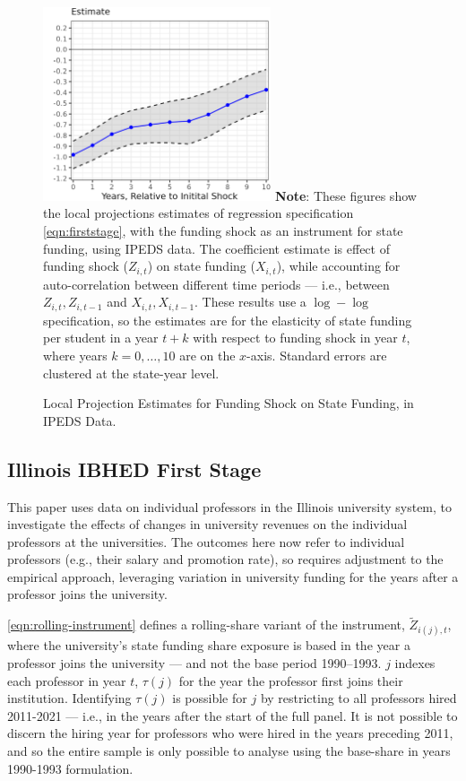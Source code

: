 \begin{figure}[H]
    \centering
    \singlespacing
    \caption{Local Projection Estimates for Funding Shock on State Funding, in IPEDS Data.}
    \includegraphics[width=0.6\textwidth]{figures/firststage-lp.png}
    \label{fig:firststage-lp}
    \justify
    \footnotesize
    \textbf{Note}:
    These figures show the local projections estimates of regression specification \eqref{eqn:firststage}, with the funding shock as an instrument for state funding, using IPEDS data.
    The coefficient estimate is effect of funding shock ($Z_{i,t}$) on state funding ($X_{i,t}$), while accounting for auto-correlation between different time periods --- i.e., between $Z_{i,t}, Z_{i,t-1}$ and $X_{i,t}, X_{i,t-1}$.
    These results use a $\log-\log$ specification, so the estimates are for the elasticity of state funding per student in a year $t+k$ with respect to funding shock in year $t$, where years $k = 0, \hdots, 10$ are on the $x$-axis. 
    Standard errors are clustered at the state-year level.
\end{figure}

\newpage
\subsection{Illinois IBHED First Stage}
\label{sec:iv-model-indiv}

This paper uses data on individual professors in the Illinois university system, to investigate the effects of changes in university revenues on the individual professors at the universities.
The outcomes here now refer to individual professors (e.g., their salary and promotion rate), so requires adjustment to the empirical approach, leveraging variation in university funding for the years after a professor joins the university.

\autoref{eqn:rolling-instrument} defines a rolling-share variant of the instrument, $\tilde Z_{i(j),t}$, where the university's state funding share exposure is based in the year a professor joins the university --- and not the base period 1990--1993.
$j$ indexes each professor in year $t$, $\tau(j)$ for the year the professor first joins their institution.
Identifying $\tau(j)$ is possible for $j$ by restricting to all professors hired 2011-2021 --- i.e., in the years after the start of the full panel.
It is not possible to discern the hiring year for professors who  were hired in the years preceding 2011, and so the entire sample is only possible to analyse using the base-share in years 1990-1993 formulation.

